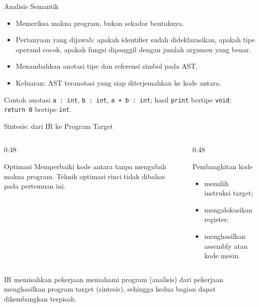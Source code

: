 \documentclass[aspectratio=169,10pt,t]{beamer}
\begin{document}
\begin{frame}{Analisis Semantik}
  \begin{itemize}
    \item Memeriksa makna program, bukan sekadar bentuknya.
    \item Pertanyaan yang dijawab: apakah identifier sudah
          dideklarasikan, apakah tipe operand cocok, apakah fungsi
          dipanggil dengan jumlah argumen yang benar.
    \item Menambahkan anotasi tipe dan referensi simbol pada AST.
    \item Keluaran: AST teranotasi yang siap diterjemahkan ke kode antara.
  \end{itemize}

  \vspace{4pt}
  \begin{exampleblock}{Contoh anotasi}
    \texttt{a : int}, \texttt{b : int}, \texttt{a + b : int};
    hasil \texttt{print} bertipe \texttt{void}; \texttt{return 0}
    bertipe \texttt{int}.
  \end{exampleblock}
\end{frame}

\begin{frame}{Sintesis: dari IR ke Program Target}
  \begin{columns}[T,onlytextwidth]
    \begin{column}{0.48\textwidth}
      \begin{block}{Optimasi}
        \footnotesize
        Memperbaiki kode antara tanpa mengubah makna program.
        Teknik optimasi rinci tidak dibahas pada pertemuan ini.
      \end{block}
    \end{column}
    \begin{column}{0.48\textwidth}
      \begin{block}{Pembangkitan kode}
        \footnotesize
        \begin{itemize}
          \item memilih instruksi target;
          \item mengalokasikan register;
          \item menghasilkan assembly atau kode mesin.
        \end{itemize}
      \end{block}
    \end{column}
  \end{columns}

  \vspace{5pt}
  {\footnotesize\color{ubbblue!80}IR memisahkan pekerjaan memahami
  program (analisis) dari pekerjaan menghasilkan program target
  (sintesis), sehingga kedua bagian dapat dikembangkan terpisah.}
\end{frame}
\end{document}
